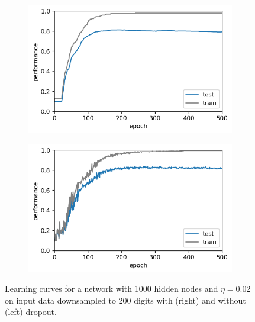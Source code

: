 \documentclass{article}
\begin{document}
\begin{figure}[h]
	\centering
	\begin{subfigure}[t]{0.42\linewidth}
		\centering
		\includegraphics[width = 1.0\linewidth, trim={5 5 5 5}, clip=true]{figures/nodropout_N1000_eta02_nepoch500_transfer_sigmoid_performance.png}
		\subcaption{}
		\label{fig:nodrop1}	
	\end{subfigure}%
\hspace{ 0.02\linewidth}
	\begin{subfigure}[t]{0.42\linewidth}
		\centering
		\includegraphics[width = 1.0\linewidth, trim={5 5 5 5}, clip=true]{figures/dropout_N1000_eta02_nepoch500_transfer_sigmoid_performance.png}
		\subcaption{}
		\label{fig:drop1}	
	\end{subfigure}%
\caption{Learning curves for a network with 1000 hidden nodes and $\eta=0.02$ on input data downsampled to 200 digits with (right) and without (left) dropout.}
\label{fig:dropout_test_train}
\end{figure}
\end{document}
